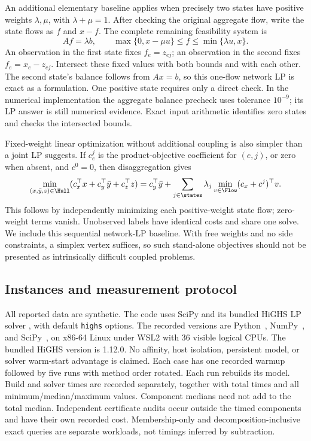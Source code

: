 An additional elementary baseline applies when precisely two states have
positive weights $\lambda,\mu$, with $\lambda+\mu=1$. After checking
the original aggregate flow, write the state flows as $f$ and $x-f$.
The complete remaining feasibility system is
\begin{equation}\label{eq:two-state-membership-lp}
 Af=\lambda b,\qquad
 \max\{0,x-\mu u\}\le f\le\min\{\lambda u,x\}.
\end{equation}
An observation in the first state fixes $f_e=z_{ej}$; an observation
in the second fixes $f_e=x_e-z_{ej}$. Intersect these fixed values
with both bounds and with each other. The second state's balance follows
from $Ax=b$, so this one-flow network LP is exact as a formulation.
One positive state requires only a direct check. In the numerical implementation
the aggregate balance precheck uses tolerance $10^{-9}$; its LP answer is
still numerical evidence. Exact input arithmetic identifies zero states and
checks the intersected bounds.

Fixed-weight linear optimization without additional coupling is also simpler
than a joint LP suggests. If $c^j_e$ is the product-objective coefficient
for $(e,j)$, or zero when absent, and $c^0=0$, then disaggregation gives
\begin{equation}\label{eq:independent-network-objectives}
 \min_{(x,\bar y,z)\in\Hull}
       (c_x^\top x+c_y^\top\bar y+c_z^\top z)
 =c_y^\top\bar y+
   \sum_{j\in\states}\lambda_j
       \min_{v\in\Flow}(c_x+c^j)^\top v.
\end{equation}
This follows by independently minimizing each positive-weight state flow;
zero-weight terms vanish. Unobserved labels have identical costs and share
one solve. We include this sequential network-LP baseline. With free weights
and no side constraints, a simplex vertex suffices, so such stand-alone
objectives should not be presented as intrinsically difficult coupled problems.

\subsection{Instances and measurement protocol}

All reported data are synthetic. The code uses SciPy
\citep{Virtanen2020} and its bundled HiGHS LP solver
\citep{HuangfuHall2018}, with default \texttt{highs} options.
The recorded versions are Python~\BenchPython, NumPy~\BenchNumpy,
and SciPy~\BenchScipy, on x86-64 Linux under WSL2 with 36 visible
logical CPUs. The bundled HiGHS version is 1.12.0. No affinity, host
isolation, persistent model, or solver warm-start advantage is claimed.
Each case has one recorded warmup followed by five runs with method order
rotated. Each run rebuilds its model. Build and solver times are recorded
separately, together with total times and all minimum/median/maximum values.
Component medians need not add to the total median. Independent certificate
audits occur outside the timed components and have their own recorded cost.
Membership-only and decomposition-inclusive exact queries are separate
workloads, not timings inferred by subtraction.

